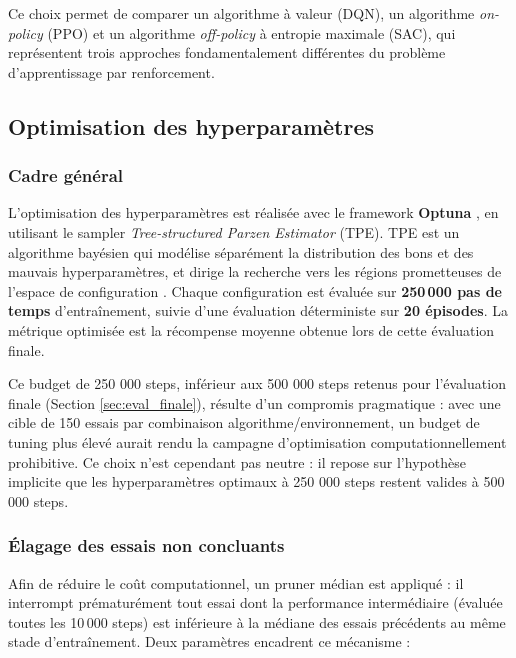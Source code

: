 Ce choix permet de comparer un algorithme à valeur (DQN), un algorithme
\textit{on-policy} (PPO) et un algorithme \textit{off-policy} à entropie
maximale (SAC), qui représentent trois approches fondamentalement différentes
du problème d'apprentissage par renforcement.

\subsection{Optimisation des hyperparamètres}

\subsubsection{Cadre général}

L'optimisation des hyperparamètres est réalisée avec le framework
\textbf{Optuna} \parencite{akibaOptunaNextgenerationHyperparameter2019}, en
utilisant le sampler \textit{Tree-structured Parzen Estimator} (TPE). TPE est un algorithme bayésien qui modélise séparément la distribution des bons et des mauvais hyperparamètres, et dirige la recherche vers les régions prometteuses de l'espace de configuration \parencite{bergstraAlgorithmsHyperparameterOptimization2011}. Chaque configuration est évaluée sur \textbf{250\,000 pas de temps} d'entraînement, suivie d'une évaluation
déterministe sur \textbf{20 épisodes}. La métrique optimisée est la récompense moyenne obtenue lors de cette évaluation finale.

Ce budget de 250 000 steps, inférieur aux 500 000 steps retenus pour l'évaluation finale (Section \ref{sec:eval_finale}), résulte d'un compromis pragmatique : avec une cible de 150 essais par combinaison algorithme/environnement, un budget de tuning plus élevé aurait rendu la campagne d'optimisation computationnellement prohibitive. Ce choix n'est cependant pas neutre : il repose sur l'hypothèse implicite que les hyperparamètres optimaux à 250 000 steps restent valides à 500 000 steps.

\subsubsection{Élagage des essais non concluants}

Afin de réduire le coût computationnel, un pruner médian est
appliqué : il interrompt prématurément tout essai dont la performance
intermédiaire (évaluée toutes les 10\,000 steps) est inférieure à la médiane
des essais précédents au même stade d'entraînement. Deux paramètres encadrent
ce mécanisme :

